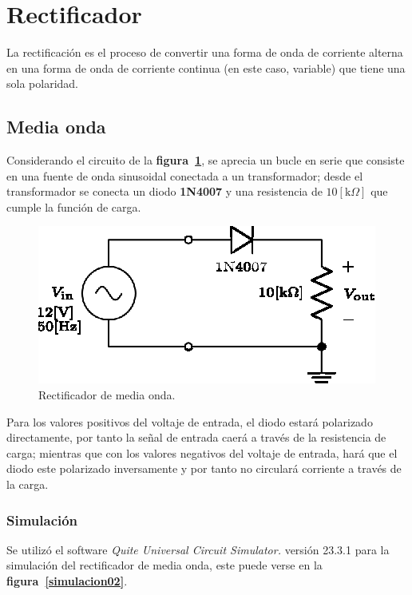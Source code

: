 \section{Rectificador}
La rectificación es el proceso de convertir una forma de onda de corriente
alterna en una forma de onda de corriente continua (en este caso, variable) que
tiene una sola polaridad.

\subsection{Media onda}
Considerando el circuito de la \textbf{figura~\ref{circuito02}}, se aprecia un
bucle en serie que consiste en una fuente de onda sinusoidal conectada a un
transformador; desde el transformador se conecta un diodo \textbf{1N4007} y una
resistencia de $10[\text{k}\Omega]$ que cumple la función de carga.

\begin{figure}[!h]
\centering
\includegraphics[scale=1.1]{diagramas/02.media_onda1.eps}
\caption{Rectificador de media onda.}
\label{circuito02}
\end{figure}

Para los valores positivos del voltaje de entrada, el diodo estará polarizado
directamente, por tanto la señal de entrada caerá a través de la resistencia de
carga; mientras que con los valores negativos del voltaje de entrada, hará que
el diodo este polarizado inversamente y por tanto no circulará corriente a
través de la carga.

\subsubsection{Simulación}
Se utilizó el software \emph{Quite Universal Circuit Simulator.} versión 23.3.1
para la simulación del rectificador de media onda, este puede verse en la
\textbf{figura~\ref{simulacion02}}.

